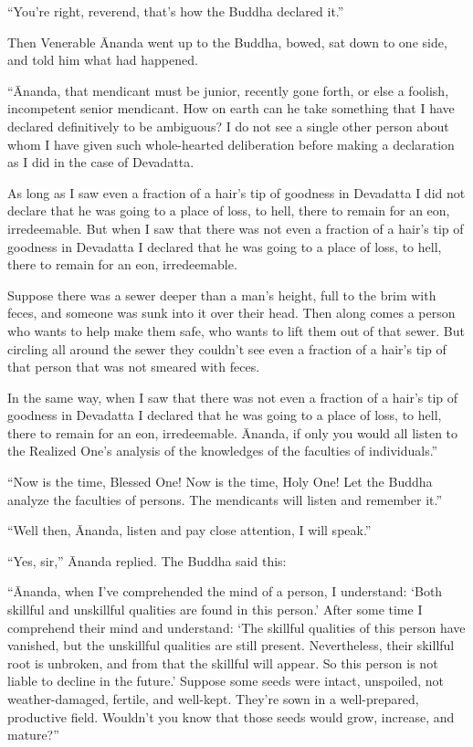 \documentclass[12pt,openany]{book}%
\begin{document}
“You’re right, reverend, that’s how the Buddha declared it.” 

Then Venerable Ānanda went up to the Buddha, bowed, sat down to one side, and told him what had happened. 

“Ānanda, that mendicant must be junior, recently gone forth, or else a foolish, incompetent senior mendicant. How on earth can he take something that I have declared definitively to be ambiguous? I do not see a single other person about whom I have given such whole-hearted deliberation before making a declaration as I did in the case of Devadatta. 

As long as I saw even a fraction of a hair’s tip of goodness in Devadatta I did not declare that he was going to a place of loss, to hell, there to remain for an eon, irredeemable. But when I saw that there was not even a fraction of a hair’s tip of goodness in Devadatta I declared that he was going to a place of loss, to hell, there to remain for an eon, irredeemable. 

Suppose there was a sewer deeper than a man’s height, full to the brim with feces, and someone was sunk into it over their head. Then along comes a person who wants to help make them safe, who wants to lift them out of that sewer. But circling all around the sewer they couldn’t see even a fraction of a hair’s tip of that person that was not smeared with feces. 

In the same way, when I saw that there was not even a fraction of a hair’s tip of goodness in Devadatta I declared that he was going to a place of loss, to hell, there to remain for an eon, irredeemable. Ānanda, if only you would all listen to the Realized One’s analysis of the knowledges of the faculties of individuals.” 

“Now is the time, Blessed One! Now is the time, Holy One! Let the Buddha analyze the faculties of persons. The mendicants will listen and remember it.” 

“Well then, Ānanda, listen and pay close attention, I will speak.” 

“Yes, sir,” Ānanda replied. The Buddha said this: 

“Ānanda, when I’ve comprehended the mind of a person, I understand: ‘Both skillful and unskillful qualities are found in this person.’ After some time I comprehend their mind and understand: ‘The skillful qualities of this person have vanished, but the unskillful qualities are still present. Nevertheless, their skillful root is unbroken, and from that the skillful will appear. So this person is not liable to decline in the future.’ Suppose some seeds were intact, unspoiled, not weather-damaged, fertile, and well-kept. They’re sown in a well-prepared, productive field. Wouldn’t you know that those seeds would grow, increase, and mature?” 
\end{document}
